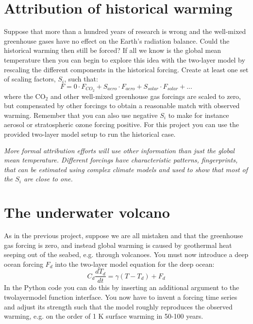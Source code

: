 \documentclass[12pt]{book}
\begin{document}
\section{Attribution of historical warming}
Suppose that more than a hundred years of research is wrong and the well-mixed greenhouse gases have no effect on the Earth's radiation balance. Could the historical warming then still be forced? 
If all we know is the global mean temperature then you can begin to explore this idea with the two-layer model by rescaling the different components in the historical forcing. Create at least one set of scaling factors, $S_i$, such that:
$$F = 0\cdot F_{CO_2} + S_{aero}\cdot F_{aero}+ S_{solar}\cdot F_{solar} + ...$$
where the CO$_2$ and other well-mixed greenhouse gas forcings are scaled to zero, but compensated by other forcings to obtain a reasonable match with observed warming. Remember that you can also use negative $S_i$ to make for instance aerosol or stratospheric ozone forcing positive. %
For this project you can use the provided two-layer model setup to run the historical case.

\vspace{0.5 cm}
\noindent
{\em More formal attribution efforts will use other information than just the global mean temperature. Different forcings have characteristic patterns, fingerprints, that can be estimated using complex climate models and used to show that most of the $S_i$ are close to one.  }


\section{The underwater volcano}
As in the previous project, suppose we are all mistaken and that the greenhouse gas forcing is zero, and instead global warming is caused by geothermal heat seeping out of the seabed, e.g. through volcanoes. You must now introduce a deep ocean forcing $F_d$ into the two-layer model equation for the deep ocean:
$$C_d\frac{dT_d}{dt} = \gamma(T-T_d) + F_d$$
In the Python code you can do this by inserting an additional argument to the twolayermodel function interface. You now have to invent a forcing time series and adjust its strength such that the model roughly reproduces the observed warming, e.g. on the order of 1 K surface warming in 50-100 years. %
\end{document}
